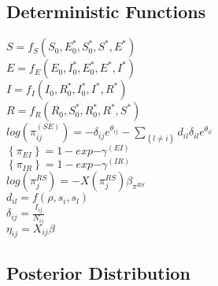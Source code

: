 \documentclass[12pt]{article}
\newcommand \noi {\noindent}
\newcommand \mbreak {\\ \vspace{0.1in}}
\begin{document}
\subsection{Deterministic Functions}

\noi $S = f_S(S_0, E^*_0, S^*_0, S^*, E^*)$ \\

\noi $E = f_E(E_0, I^*_0, E^*_0, E^*, I^*)$ \\

\noi $I = f_I(I_0, R^*_0, I^*_0, I^*, R^*)$ \\

\noi $R = f_R(R_0, S^*_0, R^*_0, R^*, S^*)$ \\

\noi $\displaystyle log(\pi^{(SE)}_{ij}) = -\delta_{ij}e^{\theta_{ij}} - \sum_{\left\{ l \ne i \right\}}d_{il}\delta_{il}e^{\theta_{il}}$\\

\noi $\left\{\pi_{EI}  \right\} = 1-exp{-\gamma^{(EI)}}$\\

\noi $\left\{\pi_{IR}  \right\} = 1-exp{-\gamma^{(IR)}}$\\

\noi $log(\pi_j^{RS}) = -X(\pi_j^{RS}) \beta_{\pi^{RS}}$\\

\noi $d_{il} = f(\rho, s_i, s_l)$\\

\noi $\delta_{ij} = \frac{I_{ij}}{N_{ij}}$ \\

\noi $\eta_{ij} = X_{ij}\beta$\mbreak

\subsection{Posterior Distribution}
\end{document}
